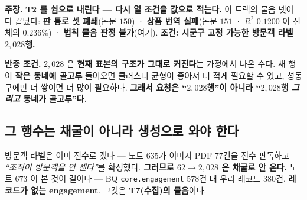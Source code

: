 \documentclass[10pt,a4paper]{article}
\newcommand{\claim}[2]{\begin{claimbox}\textbf{주장.} #1\par\smallskip
  \textcolor{gray!70}{\textbf{반증 조건.} #2}\end{claimbox}}
\begin{document}
\claim{\textbf{T2 를 쉼으로 내린다 --- 다시 열 조건을 값으로 적는다.} 이 트랙의 물음
넷이 다 끝났다: \textbf{판 통로 셋 폐쇄}(논문 $150$) · \textbf{상품 번역
실패}(논문 $151$ · $R^2$ $0.1200$ 이 전체의 $0.236\%$) · \textbf{법칙 물음 판정
불가}(여기). \textbf{조건: 시군구 고정 가능한 방문객 라벨 $2{,}028$행.}}
{$2{,}028$ 은 \textbf{현재 표본의 구조가 그대로 커진다}는 가정에서 나온 수다. 새 행이
\textbf{작은 동네에 골고루} 들어오면 클러스터 균형이 좋아져 더 적게 필요할 수 있고,
성동구에만 더 쌓이면 더 많이 필요하다. \textbf{그래서 요청은 ``$2{,}028$행''이 아니라
``$2{,}028$행 \emph{그리고} 동네가 골고루''다.}}

\subsection*{그 행수는 채굴이 아니라 생성으로 와야 한다}

방문객 라벨은 이미 전수로 캤다 --- 노트 $635$가 이미지 PDF $77$건을 전수 판독하고
\emph{``조직이 방문객을 안 센다''}를 확정했다. \textbf{그러므로 $62 \to 2{,}028$ 은
채굴로 안 온다.} 노트 $673$ 이 본 것이 길이다 --- BQ \texttt{core.engagement}
$578$건 대 우리 레코드 $380$건, \textbf{레코드가 없는 engagement}. 그것은
\textbf{T7(수집)의 물음}이다.
\end{document}
